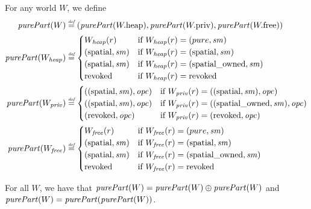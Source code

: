 \documentclass[a4paper]{article}
\begin{document}
\begin{definition}
  For any world $W$, we define
  \begin{align*}
    \purePart{W} &\defeq (\purePart{\pwheap},\purePart{\pwpriv},\purePart{\pwfree})\\
    \purePart{W_\var{heap}} &\defeq
                       \begin{cases}
                         W_{\var{heap}}(r) & \text{if } W_\var{heap}(r) = (pure,\var{sm})\\
                         (\spatial,\var{sm}) & \text{if } W_\var{heap}(r) = (\spatial,\var{sm})\\
                         (\spatial,\var{sm}) & \text{if } W_\var{heap}(r) = (\spatialo,\var{sm})\\
                         \revoked & \text{if } W_\var{heap}(r) = \revoked\\
                       \end{cases}\\
    \purePart{W_\var{priv}} &\defeq
                       \begin{cases}
                         ((\spatial,\var{sm}),\opc) & \text{if } W_\var{priv}(r) = ((\spatial,\var{sm}),\opc)\\
                         ((\spatial,\var{sm}),\opc) & \text{if } W_\var{priv}(r) = ((\spatialo,\var{sm}),\opc)\\
                         (\revoked,\opc) & \text{if } W_\var{priv}(r) = (\revoked,\opc)\\
                       \end{cases}\\
    \purePart{W_\var{free}} &\defeq
                       \begin{cases}
                         W_{\var{free}}(r) & \text{if } W_{\var{free}}(r) = (pure,\var{sm})\\
                         (\spatial,\var{sm}) & \text{if } W_{\var{free}}(r) = (\spatial,\var{sm})\\
                         (\spatial,\var{sm}) & \text{if } W_{\var{free}}(r) = (\spatialo,\var{sm})\\
                         \revoked & \text{if } W_{\var{free}}(r) = \revoked\\
                       \end{cases}
  \end{align*}
\end{definition}

\begin{lemma}
  \label{lem:purePart-idempotemt}
  For all $W$, we have that $\purePart{W} = \purePart{W} \oplus \purePart{W}$ and $\purePart{W} = \purePart{}(\purePart{W})$.
\end{lemma}
\end{document}
